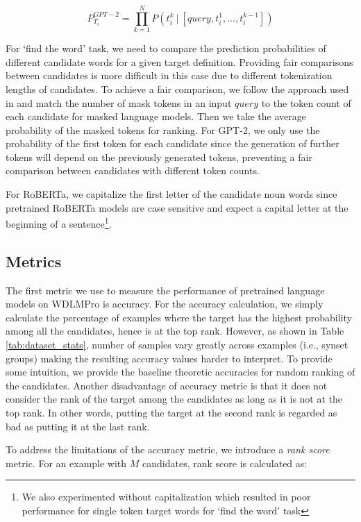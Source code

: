 \documentclass[11pt,a4paper]{article}
\begin{document}
\begin{equation*}
    P_{T_i}^{GPT-2} = \prod\limits_{k=1}^N P(t_i^k~|~[query, t_i^{1},...,t_i^{k-1}])
\end{equation*}

For `find the word' task, we need to compare the prediction probabilities of different candidate words for a given target definition. Providing fair comparisons between candidates is more difficult in this case due to different tokenization lengths of candidates. To achieve a fair comparison, we follow the approach used in \cite{Xiong20Encyclopedia} and match the number of mask tokens in an input $query$ to the token count of each candidate for masked language models. Then we take the average probability of the masked tokens for ranking. For GPT-2, we only use the probability of the first token for each candidate since the generation of further tokens will depend on the previously generated tokens, preventing a fair comparison between candidates with different token counts.

For RoBERTa, we capitalize the first letter of the candidate noun words since pretrained RoBERTa models are case sensitive and expect a capital letter at the beginning of a sentence\footnote{We also experimented without capitalization which resulted in poor performance for single token target words for `find the word' task}. 

\subsection{Metrics}

The first metric we use to measure the performance of pretrained language models on WDLMPro is accuracy. For the accuracy calculation, we simply calculate the percentage of examples where the target has the highest probability among all the candidates, hence is at the top rank. However, as shown in Table \ref{tab:dataset_stats}, number of samples vary greatly across examples (i.e., synset groups) making the resulting accuracy values harder to interpret. To provide some intuition, we provide the baseline theoretic accuracies for random ranking of the candidates. Another disadvantage of accuracy metric is that it does not consider the rank of the target among the candidates as long as it is not at the top rank. In other words, putting the target at the second rank is regarded as bad as putting it at the last rank.

To address the limitations of the accuracy metric, we introduce a \textit{rank score} metric. For an example with $M$ candidates, rank score is calculated as:
\end{document}
